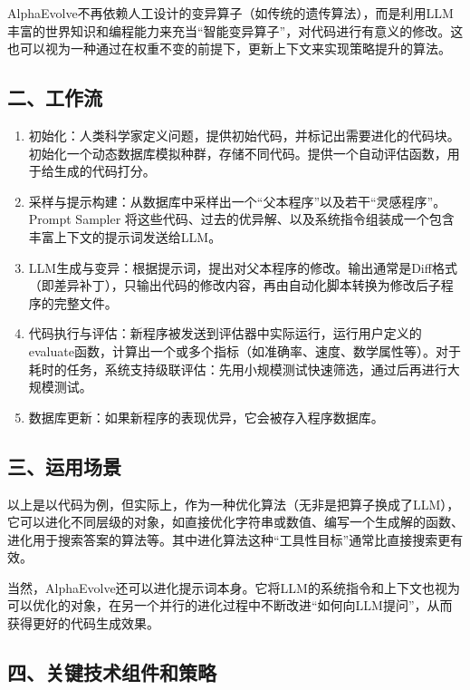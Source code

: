 AlphaEvolve不再依赖人工设计的变异算子（如传统的遗传算法），而是利用LLM丰富的世界知识和编程能力来充当``智能变异算子''，对代码进行有意义的修改。这也可以视为一种通过在权重不变的前提下，更新上下文来实现策略提升的算法。

\hypertarget{ux4e8cux5de5ux4f5cux6d41-1}{%
\subsection{二、工作流}\label{ux4e8cux5de5ux4f5cux6d41-1}}

\begin{enumerate}
\def\labelenumi{\arabic{enumi}.}
\item
  初始化：人类科学家定义问题，提供初始代码，并标记出需要进化的代码块。初始化一个动态数据库模拟种群，存储不同代码。提供一个自动评估函数，用于给生成的代码打分。
\item
  采样与提示构建：从数据库中采样出一个``父本程序''以及若干``灵感程序''。Prompt Sampler 将这些代码、过去的优异解、以及系统指令组装成一个包含丰富上下文的提示词发送给LLM。
\item
  LLM生成与变异：根据提示词，提出对父本程序的修改。输出通常是Diff格式（即差异补丁），只输出代码的修改内容，再由自动化脚本转换为修改后子程序的完整文件。
\item
  代码执行与评估：新程序被发送到评估器中实际运行，运行用户定义的evaluate函数，计算出一个或多个指标（如准确率、速度、数学属性等）。对于耗时的任务，系统支持级联评估：先用小规模测试快速筛选，通过后再进行大规模测试。
\item
  数据库更新：如果新程序的表现优异，它会被存入程序数据库。
\end{enumerate}

\hypertarget{ux4e09ux8fd0ux7528ux573aux666f}{%
\subsection{三、运用场景}\label{ux4e09ux8fd0ux7528ux573aux666f}}

以上是以代码为例，但实际上，作为一种优化算法（无非是把算子换成了LLM），它可以进化不同层级的对象，如直接优化字符串或数值、编写一个生成解的函数、进化用于搜索答案的算法等。其中进化算法这种``工具性目标''通常比直接搜索更有效。

当然，AlphaEvolve还可以进化提示词本身。它将LLM的系统指令和上下文也视为可以优化的对象，在另一个并行的进化过程中不断改进``如何向LLM提问''，从而获得更好的代码生成效果。

\hypertarget{ux56dbux5173ux952eux6280ux672fux7ec4ux4ef6ux548cux7b56ux7565}{%
\subsection{四、关键技术组件和策略}\label{ux56dbux5173ux952eux6280ux672fux7ec4ux4ef6ux548cux7b56ux7565}}

